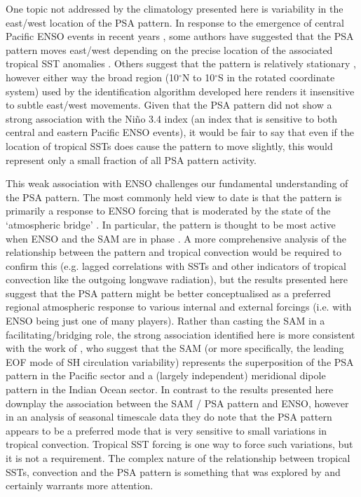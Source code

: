One topic not addressed by the climatology presented here is variability in the east/west location of the PSA pattern. In response to the emergence of central Pacific ENSO events in recent years \citep[e.g.][]{Ashok2007}, some authors have suggested that the PSA pattern moves east/west depending on the precise location of the associated tropical SST anomalies \citep[e.g.][]{Sun2013,WilsonBromwich2014,Ciasto2015}. Others suggest that the pattern is relatively stationary \citep[e.g.][]{Liu2007,Ding2012}, however either way the broad region (10$^{\circ}$N to 10$^{\circ}$S in the rotated coordinate system) used by the identification algorithm developed here renders it insensitive to subtle east/west movements. Given that the PSA pattern did not show a strong association with the Ni\~{n}o 3.4 index (an index that is sensitive to both central and eastern Pacific ENSO events), it would be fair to say that even if the location of tropical SSTs does cause the pattern to move slightly, this would represent only a small fraction of all PSA pattern activity. 

This weak association with ENSO challenges our fundamental understanding of the PSA pattern. The most commonly held view to date is that the pattern is primarily a response to ENSO forcing \citep[e.g.][]{Mo2001} that is moderated by the state of the `atmospheric bridge' \citep{Liu2007}. In particular, the pattern is thought to be most active when ENSO and the SAM are in phase \citep{Fogt2006}. A more comprehensive analysis of the relationship between the pattern and tropical convection would be required to confirm this (e.g. lagged correlations with SSTs and other indicators of tropical convection like the outgoing longwave radiation), but the results presented here suggest that the PSA pattern might be better conceptualised as a preferred regional atmospheric response to various internal and external forcings (i.e. with ENSO being just one of many players). Rather than casting the SAM in a facilitating/bridging role, the strong association identified here is more consistent with the work of \citet{Ding2012}, who suggest that the SAM (or more specifically, the leading EOF mode of SH circulation variability) represents the superposition of the PSA pattern in the Pacific sector and a (largely independent) meridional dipole pattern in the Indian Ocean sector. In contrast to \citet{Ding2012} the results presented here downplay the association between the SAM / PSA pattern and ENSO, however in an analysis of seasonal timescale data they do note that the PSA pattern appears to be a preferred mode that is very sensitive to small variations in tropical convection. Tropical SST forcing is one way to force such variations, but it is not a requirement. The complex nature of the relationship between tropical SSTs, convection and the PSA pattern is something that was explored by \citet{Harangozo2004} and certainly warrants more attention.  

